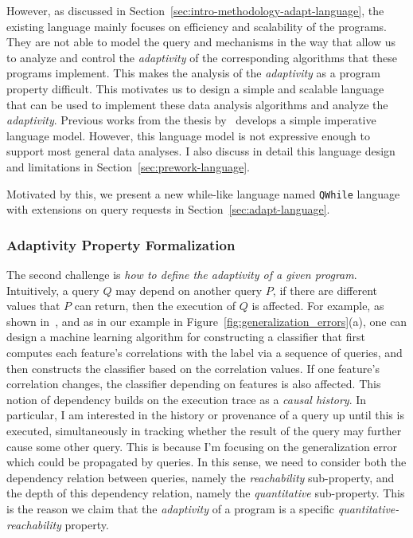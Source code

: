 However, as discussed in Section~\ref{sec:intro-methodology-adapt-language}, the existing language mainly focuses on efficiency and scalability of the programs.
They are not able to model the query and mechanisms in the way that allow
us to analyze and control the \emph{adaptivity}
of the corresponding algorithms that these programs implement.
This makes the analysis of the \emph{adaptivity} as a program property difficult.
This motivates us to design a simple and scalable language  that can be used to implement these data analysis algorithms and analyze the \emph{adaptivity}.
Previous works from the thesis by~\cite{weihao22} develops a simple imperative language model.
However, this language model is not expressive enough to
support most general data analyses.
I also discuss in detail this language design and limitations in Section~\ref{sec:prework-language}.

Motivated by this, we present a new while-like language 
named {\tt QWhile} language with extensions on query requests in Section~\ref{sec:adapt-language}.

\subsubsection{Adaptivity Property Formalization}

The second challenge is \emph{how to define the adaptivity of a given program}.
Intuitively, a query $Q$ may depend on another query $P$, if there are different values that $P$ can return,
then the execution of $Q$ is affected.
For example, as shown in~\cite{DworkFHPRR15}, and as in our example in Figure~\ref{fig:generalization_errors}(a), one can design a machine learning algorithm for constructing a classifier that first computes each feature's correlations with the label via a sequence of queries, and then constructs the classifier based on the correlation values. 
If one feature's correlation changes, the classifier depending on features is also affected. 
This notion of dependency builds on the execution trace as a \emph{causal history}. 
In particular, I am interested in the history or provenance of a query up until this is executed, 
simultaneously in tracking whether the result of the query may further cause some other query. 
This is because I'm focusing on the generalization error which could be propagated by queries.
In this sense, we need to consider both the dependency relation between queries, namely the \emph{reachability} sub-property,
and the depth of this dependency relation, namely the \emph{quantitative} sub-property.
This is the reason we claim that the \emph{adaptivity} of a program is a specific \emph{quantitative-reachability} property.

